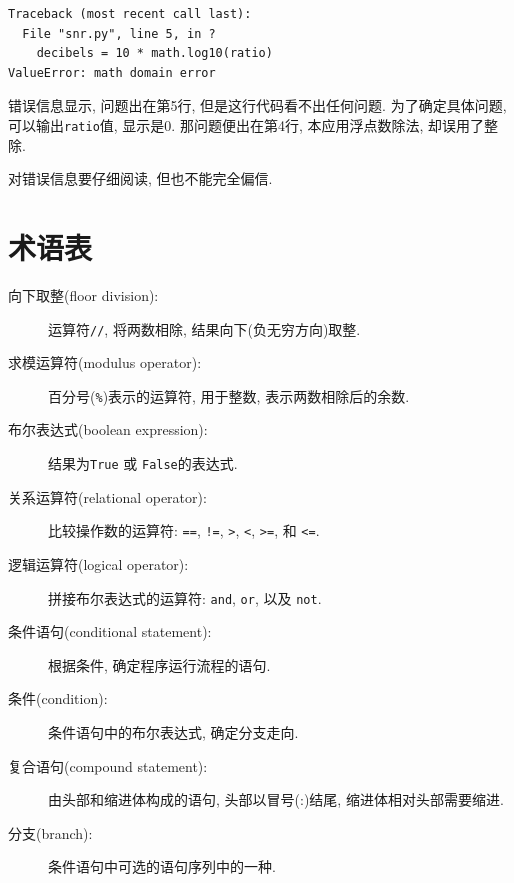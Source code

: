 \documentclass[10pt]{book}
\begin{document}
\begin{verbatim}
Traceback (most recent call last):
  File "snr.py", line 5, in ?
    decibels = 10 * math.log10(ratio)
ValueError: math domain error
\end{verbatim}
%
错误信息显示, 问题出在第5行, 
但是这行代码看不出任何问题. 
为了确定具体问题, 可以输出{\tt ratio}值, 显示是0.
那问题便出在第4行, 本应用浮点数除法, 却误用了整除.

对错误信息要仔细阅读, 但也不能完全偏信. 


\section{术语表}

\begin{description}

\item[向下取整(floor division):] 运算符{\tt //}, 将两数相除, 结果向下(负无穷方向)取整.

\item[求模运算符(modulus operator):]  百分号({\tt \%})表示的运算符, 用于整数, 表示两数相除后的余数. 

\item[布尔表达式(boolean expression):]  结果为{\tt True} 或 {\tt False}的表达式.

\item[关系运算符(relational operator):] 比较操作数的运算符: 
{\tt ==}, {\tt !=}, {\tt >}, {\tt <}, {\tt >=}, 和 {\tt <=}.

\item[逻辑运算符(logical operator):]  拼接布尔表达式的运算符: 
{\tt and}, {\tt or}, 以及 {\tt not}.

\item[条件语句(conditional statement):]  根据条件, 确定程序运行流程的语句.

\item[条件(condition):] 条件语句中的布尔表达式, 确定分支走向.

\item[复合语句(compound statement):]  由头部和缩进体构成的语句, 头部以冒号(:)结尾, 
缩进体相对头部需要缩进.

\item[分支(branch):] 条件语句中可选的语句序列中的一种. 


\end{description}
\end{document}
